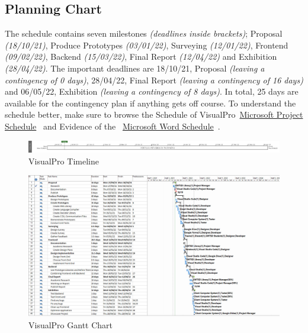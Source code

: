 \documentclass[conference]{IEEEtran}
\begin{document}
      \begin{landscape}
        \thispagestyle{fancylandscape}
        \subsection{Planning Chart}
        \label{subsec:rp-planningChart}
          The schedule contains seven milestones \textit{(deadlines inside brackets)}; Proposal \textit{(18/10/21)}, Produce Prototypes \textit{(03/01/22)}, Surveying \textit{(12/01/22)}, Frontend \textit{(09/02/22)}, Backend \textit{(15/03/22)}, Final Report \textit{(12/04/22)} and Exhibition \textit{(28/04/22)}. The important deadlines are 18/10/21, Proposal \textit{(leaving a contingency of 0 days)}, 28/04/22, Final Report \textit{(leaving a contingency of 16 days)} and 06/05/22, Exhibition \textit{(leaving a contingency of 8 days)}. In total, 25 days are available for the contingency plan if anything gets off course. To understand the schedule better, make sure to browse the Schedule of VisualPro~\href{https://github.com/ShinkuKira21/VisualPro-FinalProject/blob/main/Project/VisualPro.mpp?raw=true}{Microsoft Project Schedule}~\cite{patch_visualpro_2021} and Evidence of the ~\href{https://github.com/ShinkuKira21/VisualPro-FinalProject/blob/main/Project/Plan.docx?raw=true}{Microsoft Word Schedule}~\cite{patch_visualpro_2021-1}. 

          \begin{figure}[h]
            \includegraphics[width=1.30\textwidth]{Figures/timeline.jpg}
            \caption{VisualPro Timeline}
          \end{figure}

          \begin{figure}[h]
            \includegraphics[height=.60\textheight, width=1.30\textwidth]{Figures/VisualPro.jpg}
            \caption{VisualPro Gantt Chart}
          \end{figure}
      \end{landscape}
\end{document}
